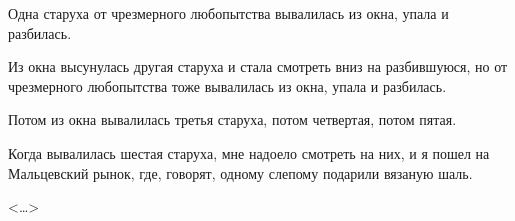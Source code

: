 Одна  старуха от чрезмерного любопытства вывалилась из окна, упала и разбилась.

Из окна высунулась другая старуха и стала смотреть вниз на разбившуюся, но от чрезмерного любопытства тоже вывалилась из окна, упала и разбилась.

Потом из окна вывалилась третья старуха, потом четвертая, потом пятая.

Когда вывалилась шестая старуха, мне надоело смотреть на них, и я пошел на Мальцевский рынок, где, говорят, одному слепому подарили вязаную шаль.
\begin{flushright} <\dots> \end{flushright}